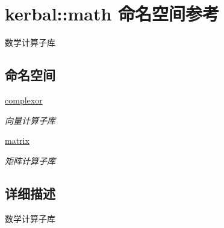 \hypertarget{namespacekerbal_1_1math}{}\section{kerbal\+:\+:math 命名空间参考}
\label{namespacekerbal_1_1math}


数学计算子库  


\subsection*{命名空间}
\begin{DoxyCompactItemize}
\item 
 \hyperlink{namespacekerbal_1_1math_1_1complexor}{complexor}
\begin{DoxyCompactList}\small\item\em 向量计算子库 \end{DoxyCompactList}\item 
 \hyperlink{namespacekerbal_1_1math_1_1matrix}{matrix}
\begin{DoxyCompactList}\small\item\em 矩阵计算子库 \end{DoxyCompactList}\end{DoxyCompactItemize}


\subsection{详细描述}
数学计算子库 